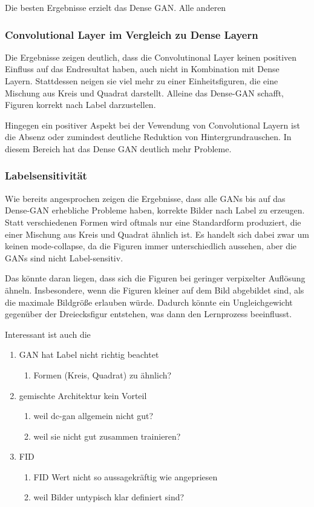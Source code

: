 Die besten Ergebnisse erzielt das Dense GAN.
Alle anderen 
\subsubsection{Convolutional Layer im Vergleich zu Dense Layern}
Die Ergebnisse zeigen deutlich, dass die Convolutinonal Layer keinen positiven Einfluss auf das Endresultat haben, auch nicht in Kombination mit Dense Layern.
Stattdessen neigen sie viel mehr zu einer Einheitsfiguren, die eine Mischung aus Kreis und Quadrat darstellt.
Alleine das Dense-GAN schafft, Figuren korrekt nach Label darzustellen.

Hingegen ein positiver Aspekt bei der Vewendung von Convolutional Layern ist die Absenz oder zumindest deutliche Reduktion von Hintergrundrauschen.
In diesem Bereich hat das Dense GAN deutlich mehr Probleme.

\subsubsection{Labelsensitivität}
Wie bereits angesprochen zeigen die Ergebnisse, dass alle GANs bis auf das Dense-GAN erhebliche Probleme haben, korrekte Bilder nach Label zu erzeugen.
Statt verschiedenen Formen wird oftmals nur eine Standardform produziert, die einer Mischung aus Kreis und Quadrat ähnlich ist.
Es handelt sich dabei zwar um keinen mode-collapse, da die Figuren immer unterschiedlich aussehen, aber die GANs sind nicht Label-sensitiv.

Das könnte daran liegen, dass sich die Figuren bei geringer verpixelter Auflösung ähneln.
Insbesondere, wenn die Figuren kleiner auf dem Bild abgebildet sind, als die maximale Bildgröße erlauben würde.
Dadurch könnte ein Ungleichgewicht gegenüber der Dreiecksfigur entstehen, was dann den Lernprozess beeinflusst.
\newline



Interessant ist auch die 

\begin{enumerate}
	\item GAN hat Label nicht richtig beachtet
	\begin{enumerate}
		\item Formen (Kreis, Quadrat) zu ähnlich?
	\end{enumerate}

	\item gemischte Architektur kein Vorteil
	\begin{enumerate}
		\item weil dc-gan allgemein nicht gut?
		\item weil sie nicht gut zusammen trainieren?
	\end{enumerate}

	\item FID
	\begin{enumerate}
		\item FID Wert nicht so aussagekräftig wie angepriesen
		\item weil Bilder untypisch klar definiert sind?
	\end{enumerate}
\end{enumerate}

